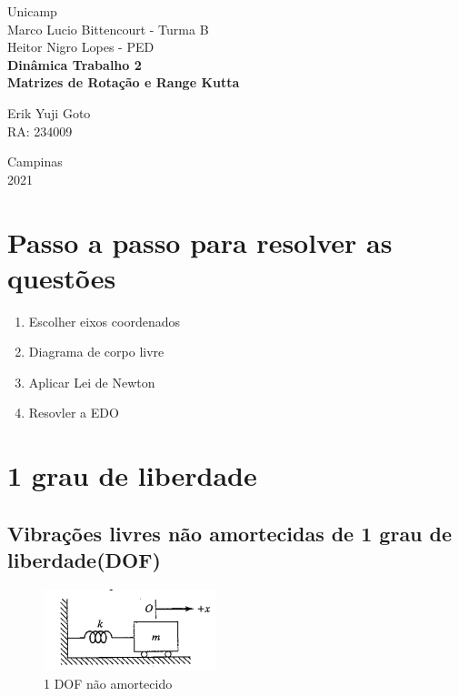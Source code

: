 \documentclass[a4paper, 12pt]{article}
\begin{document}
%
\begin{titlepage} %
	\begin{center} %
		{\large Unicamp}\\[0.4cm] %
		{\large Marco Lucio Bittencourt - Turma B}\\
		{\large Heitor Nigro Lopes - PED}\\[3.2cm]
		{\bf \huge Dinâmica Trabalho 2}\\[0.2cm] 
		{\bf \large Matrizes de Rotação e Range Kutta}\\[4.9cm]
	\end{center} %
	{\large Erik Yuji Goto}\\ %
	RA: 234009\\[10cm]
	\begin{center}
	
		{\large Campinas}\\[0.2cm]
		{\large 2021}
	\end{center}
\end{titlepage} %


\tableofcontents
\newpage

\section{Passo a passo para resolver as questões}
	\begin{enumerate}
	\item Escolher eixos coordenados
	\item Diagrama de corpo livre
	\item Aplicar Lei de Newton
	\item Resovler a EDO
	\end{enumerate}		
	
\section{1 grau de liberdade}
\subsection{Vibrações livres não amortecidas de 1 grau de liberdade(DOF)}
	
	\begin{figure}[h]
	\centering
	\includegraphics[scale=1.5]{a.png}
	\caption{1 DOF não amortecido}
	\end{figure}
	
\end{document}
